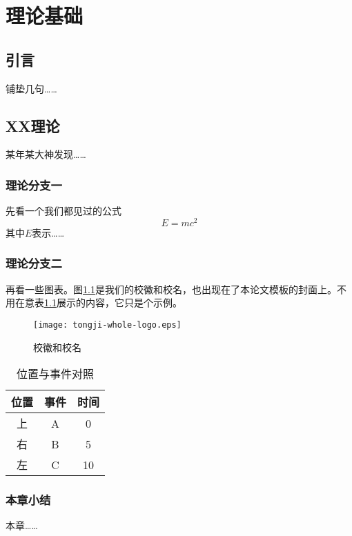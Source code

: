 \chapter{理论基础}
\label{chap:basis}

\section{引言}

铺垫几句……

\section{XX理论}

某年某大神发现……

\subsection{理论分支一}

先看一个我们都见过的公式
\begin{equation}
	E = m c^2
\end{equation}
其中$E$表示……

\subsection{理论分支二}

再看一些图表。图\ref{fig:logo}是我们的校徽和校名，也出现在了本论文模板的封面上。不用在意表\ref{tab:events}展示的内容，它只是个示例。
\begin{figure}[!h]
	\centering
	\texttt{[image: tongji-whole-logo.eps]}
	\caption{校徽和校名}
	\label{fig:logo}
\end{figure}

\begin{table}[!htbp]
	\centering
	\caption{位置与事件对照}
	\label{tab:events}
	\begin{tabular}{ccc}
		\toprule 
		位置 & 事件 & 时间\\ 
		\midrule 
		上 & A & 0 \\
		右 & B & 5 \\ 
		左 & C & 10 \\
		\bottomrule 
	\end{tabular}
\end{table}



\subsection{本章小结}
本章……